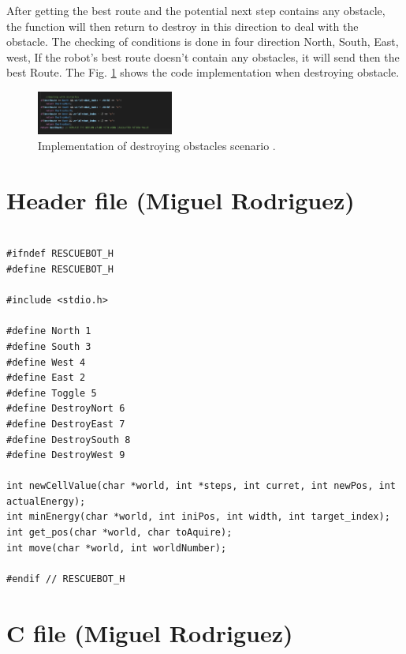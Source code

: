 \documentclass[10pt,journal,compsoc]{IEEEtran}
\begin{document}
After getting the best route and the potential next step contains any obstacle, the function  will then return to destroy in this direction to deal with the obstacle. The checking of conditions is done in four direction North, South, East, west, If the robot's best route doesn't contain any obstacles, it will send then the best Route. The Fig. \ref{obstCode} shows the code implementation when destroying obstacle. 

\begin{figure}[!h]
	
	\centering
	\includegraphics[width=0.4\textwidth]{oBSTECLEScODE.png}
	\caption{\label{obstCode} Implementation of destroying obstacles scenario  .}
	
\end{figure}



\section{Header file (Miguel Rodriguez)}


\begin{lstlisting}[label = header]

#ifndef RESCUEBOT_H
#define RESCUEBOT_H

#include <stdio.h>

#define North 1
#define South 3
#define West 4
#define East 2
#define Toggle 5
#define DestroyNort 6
#define DestroyEast 7
#define DestroySouth 8
#define DestroyWest 9

int newCellValue(char *world, int *steps, int curret, int newPos, int actualEnergy);
int minEnergy(char *world, int iniPos, int width, int target_index);
int get_pos(char *world, char toAquire);
int move(char *world, int worldNumber);

#endif // RESCUEBOT_H

\end{lstlisting}

\section{C file (Miguel Rodriguez)}
\end{document}
